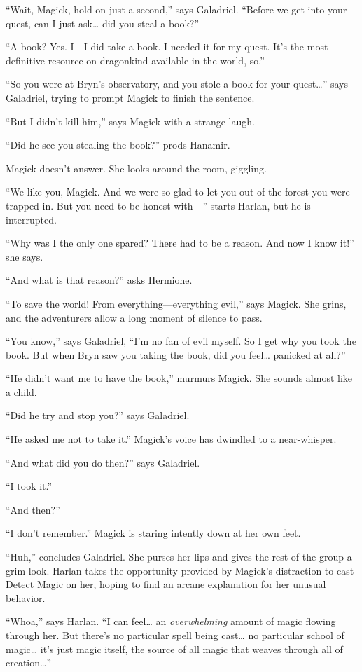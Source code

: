 \documentclass[smalldemyvopaper,11pt,twoside,onecolumn,openright,extrafontsizes]{memoir}
\begin{document}
``Wait, Magick, hold on just a second,'' says Galadriel. ``Before we get
into your quest, can I just ask\ldots{} did you steal a book?''

``A book? Yes. I---I did take a book. I needed it for my quest. It's the
most definitive resource on dragonkind available in the world, so.''

``So you were at Bryn's observatory, and you stole a book for your
quest\ldots{}'' says Galadriel, trying to prompt Magick to finish the
sentence.

``But I didn't kill him,'' says Magick with a strange laugh.

``Did he see you stealing the book?'' prods Hanamir.

Magick doesn't answer. She looks around the room, giggling.

``We like you, Magick. And we were so glad to let you out of the forest
you were trapped in. But you need to be honest with---'' starts Harlan,
but he is interrupted.

``Why was I the only one spared? There had to be a reason. And now I
know it!'' she says.

``And what is that reason?'' asks Hermione.

``To save the world! From everything---everything evil,'' says Magick.
She grins, and the adventurers allow a long moment of silence to pass.

``You know,'' says Galadriel, ``I'm no fan of evil myself. So I get why
you took the book. But when Bryn saw you taking the book, did you
feel\ldots{} panicked at all?''

``He didn't want me to have the book,'' murmurs Magick. She sounds
almost like a child.

``Did he try and stop you?'' says Galadriel.

``He asked me not to take it.'' Magick's voice has dwindled to a
near-whisper.

``And what did you do then?'' says Galadriel.

``I took it.''

``And then?''

``I don't remember.'' Magick is staring intently down at her own feet.

``Huh,'' concludes Galadriel. She purses her lips and gives the rest of
the group a grim look. Harlan takes the opportunity provided by Magick's
distraction to cast Detect Magic on her, hoping to find an arcane
explanation for her unusual behavior.

``Whoa,'' says Harlan. ``I can feel\ldots{} an \emph{overwhelming}
amount of magic flowing through her. But there's no particular spell
being cast\ldots{} no particular school of magic\ldots{} it's just magic
itself, the source of all magic that weaves through all of
creation\ldots{}''
\end{document}
